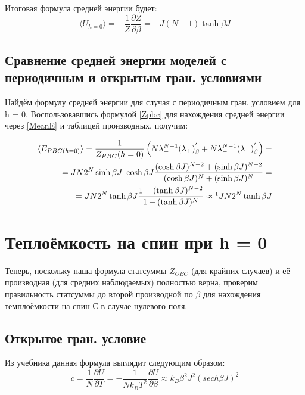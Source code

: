 \documentclass{article}
\newcommand{\bj}{\beta J}
\newcommand{\lp}{\lambda_{+}}
\newcommand{\lm}{\lambda_{-}}
\newcommand{\pbc}{_{PBC}}
\newcommand{\obc}{_{OBC}}
\newcommand{\dzdb}{\frac{\partial Z}{\partial \beta}}
\newcommand{\prpb}{^{'}_{\beta}}
\newcommand{\la}{\langle}
\newcommand{\ra}{\rangle}
\numberwithin{equation}{section}
\begin{document}
Итоговая формула средней энергии будет:
\[ \langle U_{h=0} \rangle = - \frac{1}{Z} \dzdb = - J (N - 1) \tanh{\bj}\]

\subsection{Сравнение средней энергии моделей с периодичным и открытым гран. условиями}

Найдём формулу средней энергии для случая с периодичным гран. условием для h = 0. Воспользовавшись формулой \eqref{Zpbc} для нахождения средней энергии через \eqref{MeanE} и таблицей производных, получим:

\begin{align*}
    \la E_{PBC (h = 0)} \ra = \frac{1}{Z\pbc(h = 0)}\left(N\lp^{N-1}(\lp)\prpb + N\lm^{N-1}(\lm)\prpb \right) = \\
    = JN2^{N}\sinh{\bj}\ \cosh{\bj} \frac{(\cosh{\bj})^{N-2} + (\sinh{\bj})^{N-2}}{(\cosh{\bj})^{N} + (\sinh{\bj})^{N}} = \\
    = JN2^{N} \tanh{\bj} \frac{1 + (\tanh{\bj})^{N-2}}{1 + (\tanh{\bj})^{N}} \approx \footnotemark JN2^{N} \tanh{\bj}
\end{align*}


\section{Теплоёмкость на спин при h = 0}
Теперь, поскольку наша формула статсуммы $Z\obc$ (для крайних случаев) и её производная (для средних наблюдаемых) полностью верна, проверим правильность статсуммы до второй производной по $\beta$ для нахождения темплоёмкости на спин С в случае нулевого поля.

\subsection{Открытое гран. условие}

Из учебника данная формула выглядит следующим образом:
\[ c = \frac{1}{N} \frac{\partial U}{\partial T} = - \frac{1}{N k_{B} T^{2}} \frac{\partial U}{\partial \beta} \approx k_{B} \beta^{2} J^{2} (sech \bj)^{2} \]
\end{document}
